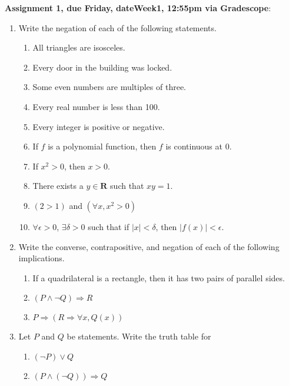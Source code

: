 \documentclass[12pt]{article}
\newcommand{\HWdueTime}{12:55pm }
\begin{document}

\noindent \textbf{Assignment 1, due Friday, \csname dateWeek1\endcsname, \HWdueTime via Gradescope}:
\begin{enumerate}

\item Write the negation of each of the following statements.

 \begin{enumerate}
\item All triangles are isosceles.
\item Every door in the building was locked.
\item Some even numbers are multiples of three.
\item Every real number is less than 100.
\item Every integer is positive or negative.
\item If $f$ is a polynomial function, then $f$ is continuous at $0$.
\item If $x^2 > 0$, then $x > 0$.
\item There exists a $y \in \mathbf{R}$ such that $xy = 1$.
\item $(2 > 1)$ and $(\forall x, x^2 > 0)$
\item $\forall \epsilon > 0$, $\exists \delta > 0$ such that if $|x| < \delta$, then $|f(x)| < \epsilon$.
\end{enumerate}

\item Write the converse, contrapositive, and negation of each of the following implications.

 \begin{enumerate}
\item If a quadrilateral is a rectangle, then it has two pairs of parallel sides.
\item $(P \wedge \neg Q) \Rightarrow R$
\item $P  \Rightarrow (R \Rightarrow \forall x, Q(x))$
\end{enumerate}

\item Let $P$ and $Q$ be statements. Write the truth table for
  \begin{enumerate}
  \item $(\neg P) \vee Q$
  \item $(P \wedge (\neg Q)) \Rightarrow Q$
  \end{enumerate}


\end{enumerate}
\end{document}
